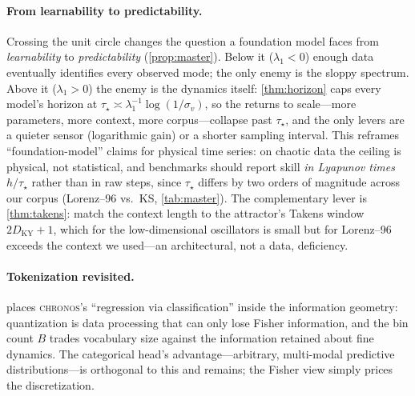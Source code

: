 \documentclass[10pt]{article}
\theoremstyle{plain}
\theoremstyle{definition}
\theoremstyle{remark}
\newcommand{\Chronos}{\textsc{chronos}}
\newcommand{\DKY}{D_{\mathrm{KY}}}
\begin{document}
\paragraph{From learnability to predictability.}
Crossing the unit circle changes the question a foundation model faces from
\emph{learnability} to \emph{predictability} (\cref{prop:master}). Below it
($\lambda_1<0$) enough data eventually identifies every observed mode; the only
enemy is the sloppy spectrum. Above it ($\lambda_1>0$) the enemy is the dynamics
itself: \cref{thm:horizon} caps every model's horizon at $\tau_\star\asymp
\lambda_1^{-1}\log(1/\sigma_v)$, so the returns to scale---more parameters, more
context, more corpus---collapse past $\tau_\star$, and the only levers are a
quieter sensor (logarithmic gain) or a shorter sampling interval. This reframes
``foundation-model'' claims for physical time series: on chaotic data the ceiling
is physical, not statistical, and benchmarks should report skill \emph{in
Lyapunov times} $h/\tau_\star$ rather than in raw steps, since $\tau_\star$
differs by two orders of magnitude across our corpus (Lorenz--96 vs.\ KS,
\cref{tab:master}). The complementary lever is \cref{thm:takens}: match the
context length to the attractor's Takens window $2\DKY+1$, which for the
low-dimensional oscillators is small but for Lorenz--96 exceeds the context we
used---an architectural, not a data, deficiency.

\paragraph{Tokenization revisited.}
 places \Chronos's ``regression via classification'' inside the
information geometry: quantization is data processing that can only lose Fisher
information, and the bin count $B$ trades vocabulary size against the information
retained about fine dynamics. The categorical head's advantage---arbitrary,
multi-modal predictive distributions---is orthogonal to this and remains; the
Fisher view simply prices the discretization.
\end{document}
